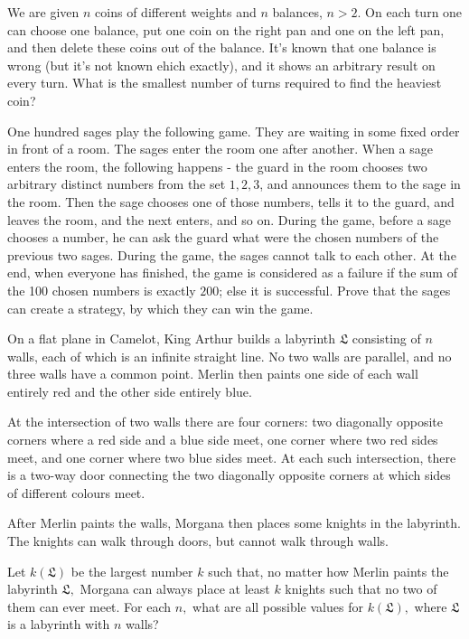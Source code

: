 \documentclass[11pt]{scrartcl}
\begin{document}
\begin{problem}[2211812924503059239]
	We are given $n$ coins of different weights and $n$ balances, $n>2$. On each turn one can choose one balance, put one coin on the right pan and one on the left pan, and then delete these coins out of the balance. It's known that one balance is wrong (but it's not known ehich exactly), and it shows an arbitrary result on every turn. What is the smallest number of turns required to find the heaviest coin?
\end{problem}
\begin{problem}[2212576839999739806]
	One hundred sages play the following game. They are waiting in some fixed order in front of a room. The sages enter the room one after another. When a sage enters the room, the following happens - the guard in the room chooses two arbitrary distinct numbers from the set {$1,2,3$}, and announces them to the sage in the room. Then the sage chooses one of those numbers, tells it to the guard, and leaves the room, and the next enters, and so on. During the game, before a sage chooses a number, he can ask the guard what were the chosen numbers of the previous two sages. During the game, the sages cannot talk to each other. At the end, when everyone has finished, the game is considered as a failure if the sum of the 100 chosen numbers is exactly $200$; else it is successful. Prove that the sages can create a strategy, by which they can win the game.
\end{problem}
\begin{problem}[2252133047011954512]
On a flat plane in Camelot, King Arthur builds a labyrinth $\mathfrak{L}$ consisting of $n$ walls, each of which is an infinite straight line. No two walls are parallel, and no three walls have a common point. Merlin then paints one side of each wall entirely red and the other side entirely blue.

At the intersection of two walls there are four corners: two diagonally opposite corners where a red side and a blue side meet, one corner where two red sides meet, and one corner where two blue sides meet. At each such intersection, there is a two-way door connecting the two diagonally opposite corners at which sides of different colours meet.

After Merlin paints the walls, Morgana then places some knights in the labyrinth. The knights can walk through doors, but cannot walk through walls.

Let $k(\mathfrak{L})$ be the largest number $k$ such that, no matter how Merlin paints the labyrinth $\mathfrak{L},$ Morgana can always place at least $k$ knights such that no two of them can ever meet. For each $n,$ what are all possible values for $k(\mathfrak{L}),$ where $\mathfrak{L}$ is a labyrinth with $n$ walls?
\end{problem}
\end{document}
